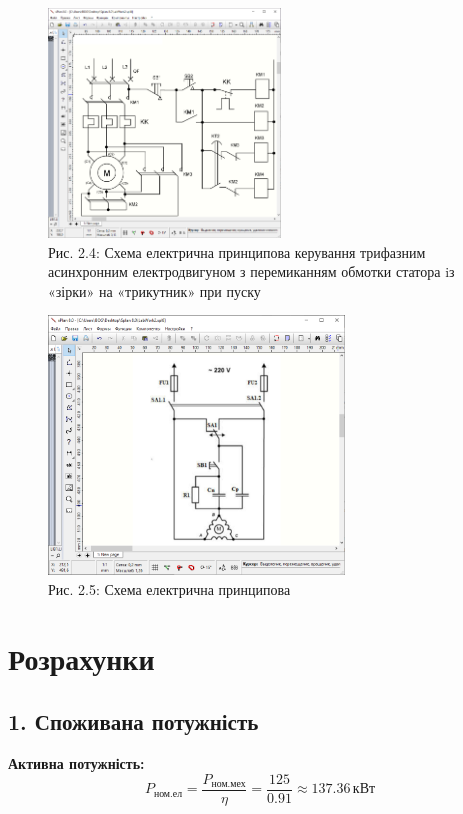 \documentclass[a4paper]{article}
\begin{document}
\begin{figure}[h]
    \centering
    \includegraphics[width=0.55\textwidth]{imgs/LW2.4.png}
    \caption*{Рис. 2.4: Схема електрична принципова керування трифазним асинхронним
електродвигуном з перемиканням обмотки статора iз «зірки» на «трикутник» при пуску}
\end{figure}

\newpage
\begin{figure}[h]
    \centering
    \includegraphics[width=0.7\textwidth]{imgs/LW2.4.2.png}
    \caption*{Рис. 2.5: Схема електрична принципова}
\end{figure}



    \section*{Розрахунки}


\subsection*{1. Споживана потужність}
\textbf{Активна потужність:}
\[
P_{\text{ном.ел}} = \frac{P_{\text{ном.мех}}}{\eta} = \frac{125}{0.91} \approx 137.36 \, \text{кВт}
\]
\end{document}
